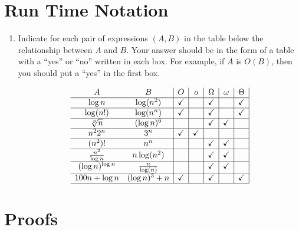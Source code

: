 \documentclass[11pt]{article}
\begin{document}
\section*{Run Time Notation}

\begin{enumerate}

\item Indicate for each pair of expressions $(A,B)$ in the table below
the relationship between $A$ and $B$.  Your answer should be in the
form of a table with a ``yes'' or ``no'' written in each box.  For
example, if $A$ is $O(B)$, then you should put a ``yes'' in the 
first box.

$$
\begin{array}{cc|c|c|c|c|c|}
A & B & O & o & \Omega & \omega & \Theta \\ \hline
\log{n} & \log(n^2) & \checkmark & & \checkmark & & \checkmark \\ \hline
\log (n!) & \log(n^n) & \checkmark & & \checkmark & & \checkmark \\ \hline
\sqrt[3]{n} & (\log n)^{6} & & & \checkmark & \checkmark & \\ \hline
n^22^n & 3^n & \checkmark & \checkmark & & & \\ \hline
(n^2)! & n^n & & & \checkmark & \checkmark & \\ \hline
{n^2 \over \log{n}} & n \log(n^2) & & & \checkmark & \checkmark & \\ \hline
(\log n)^{\log n} & {n \over \log(n)} & & & \checkmark & \checkmark & \\ \hline
100n + \log n & (\log n)^{3} + n & \checkmark & & \checkmark & &\checkmark  \\ \hline
\end{array}
$$

\end{enumerate}

\section*{Proofs}
\end{document}
